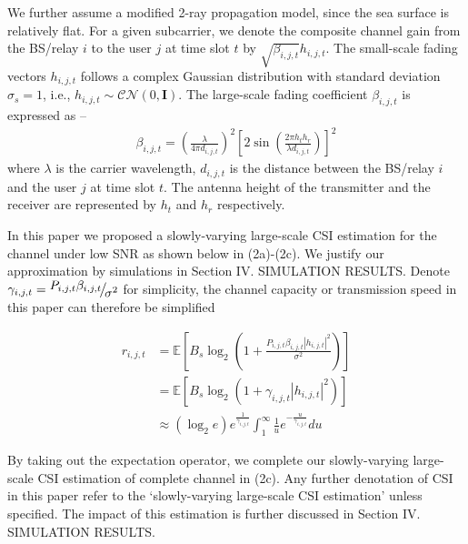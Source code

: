 \documentclass{ieeeaccess}
\begin{document}
We further assume a modified 2-ray propagation model, since the sea surface is relatively flat. For a given subcarrier, we denote the composite channel gain from the BS/relay $i$ to the user $j$ at time slot $t$ by $\sqrt {{\beta _{i,j,t}}} {h_{i,j,t}}$. The small-scale fading vectors ${h_{i,j,t}}$ follows a complex Gaussian distribution with standard deviation ${\sigma _s} = 1$, i.e., ${h_{i,j,t}} \sim \mathcal{CN}(0, \mathbf{I})$. The large-scale fading coefficient ${\beta _{i,j,t}}$ is expressed as \cite{p0}--\cite{p2}
\begin{align}
{\beta _{i,j,t}} = {\left( {\frac{\lambda }{{4\pi {d_{i,j,t}}}}} \right)^2}{\left[ {2\sin \left( {\frac{{2\pi {h_t}{h_r}}}{{\lambda {d_{i,j,t}}}}} \right)} \right]^2}
\end{align}
where $\lambda $ is the carrier wavelength, ${d_{i,j,t}}$ is the distance between the BS/relay $i$ and the user $j$ at time slot $t$. The antenna height of the transmitter and the receiver are represented by $h_t$ and $h_r$ respectively.

In this paper we proposed a slowly-varying large-scale CSI estimation for the channel under low SNR as shown below in (2a)-(2c). We justify our approximation by simulations in Section IV. SIMULATION RESULTS. Denote ${\gamma _{i,j,t}} = {\raise0.7ex\hbox{${{P_{i,j,t}}{\beta _{i,j,t}}}$} \!\mathord{\left/
 {\vphantom {{{P_{i,j,t}}{\beta _{i,j,t}}} {{\sigma ^2}}}}\right.\kern-\nulldelimiterspace}
\!\lower0.7ex\hbox{${{\sigma ^2}}$}}$ for simplicity, the channel capacity or transmission speed in this paper can therefore be simplified

\begin{subequations}
\begin{align}
{r_{i,j,t}} & = {\mathbb{E}}\left [ {{B_s}{{\log }_2}\left( {1 + \frac{{{P_{i,j,t}}{\beta _{i,j,t}}{{\left| {{h_{i,j,t}}} \right|}^2}}}{{{\sigma ^2}}}} \right)} \right ] \\
& = {\mathbb{E}}\left [  {B_s}{\log }_2 \left( {1 + {\gamma _{i,j,t}}{{\left| {{h_{i,j,t}}} \right|}^2}} \right)  \right ] \\
& \approx \left( {{{\log }_2}e} \right){e^{\frac{1}{{{\gamma _{i,j,t}}}}}}\int_1^\infty  {\frac{1}{u}{e^{ - \frac{u}{{{\gamma _{i,j,t}}}}}}du} 
\end{align}
\end{subequations}

By taking out the expectation operator, we complete our slowly-varying large-scale CSI estimation of complete channel in (2c). Any further denotation of CSI in this paper refer to the `slowly-varying large-scale CSI estimation' unless specified. The impact of this estimation is further discussed in Section IV. SIMULATION RESULTS.
\end{document}
